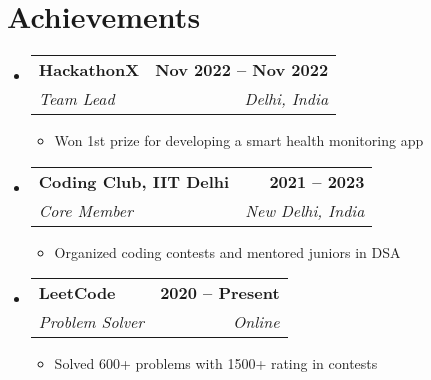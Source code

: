 \documentclass[letterpaper,11pt]{article}
\makeatletter
\newcommand{\resumeItem}[1]{\item\small{#1 \vspace{-2pt}}}
\newcommand{\resumeSubheading}[4]{
  \vspace{-2pt}\item
    \begin{tabular*}{1.0\textwidth}[t]{l@{\extracolsep{\fill}}r}
      \textbf{#1} & \textbf{\small #2} \\
      \textit{\small#3} & \textit{\small #4} \\
    \end{tabular*}\vspace{-7pt}
}
\newcommand{\resumeSubHeadingListStart}{\begin{itemize}[leftmargin=0.0in, label={}]}
\newcommand{\resumeSubHeadingListEnd}{\end{itemize}}
\newcommand{\resumeItemListStart}{\begin{itemize}}
\newcommand{\resumeItemListEnd}{\end{itemize}\vspace{-5pt}}
\makeatother
\begin{document}
\section{Achievements}
\resumeSubHeadingListStart
  \resumeSubheading
    { HackathonX }{ Nov 2022 -- Nov 2022 }
    { Team Lead }{ Delhi, India }
    \resumeItemListStart
      \resumeItem{ Won 1st prize for developing a smart health monitoring app }
    \resumeItemListEnd

  \resumeSubheading
    { Coding Club, IIT Delhi }{ 2021 -- 2023 }
    { Core Member }{ New Delhi, India }
    \resumeItemListStart
      \resumeItem{ Organized coding contests and mentored juniors in DSA }
    \resumeItemListEnd
    
  \resumeSubheading
    { LeetCode }{ 2020 -- Present }
    { Problem Solver }{ Online }
    \resumeItemListStart
      \resumeItem{ Solved 600+ problems with 1500+ rating in contests }
    \resumeItemListEnd
\resumeSubHeadingListEnd
\end{document}
